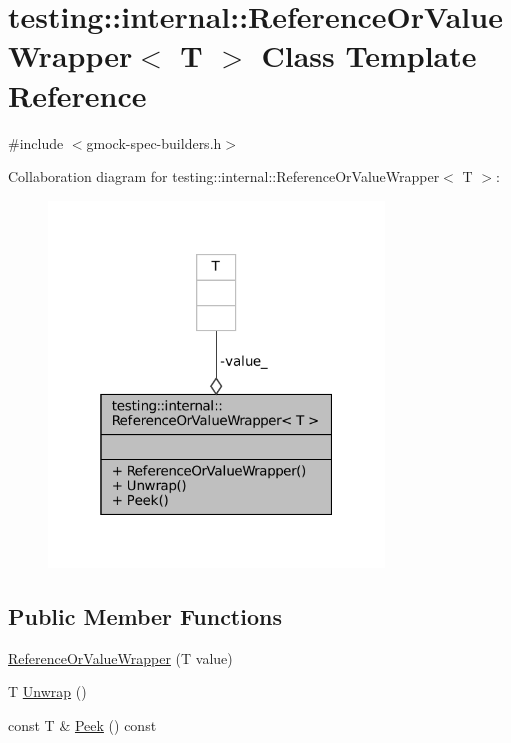 \hypertarget{classtesting_1_1internal_1_1ReferenceOrValueWrapper}{}\section{testing\+:\+:internal\+:\+:Reference\+Or\+Value\+Wrapper$<$ T $>$ Class Template Reference}
\label{classtesting_1_1internal_1_1ReferenceOrValueWrapper}


{\ttfamily \#include $<$gmock-\/spec-\/builders.\+h$>$}



Collaboration diagram for testing\+:\+:internal\+:\+:Reference\+Or\+Value\+Wrapper$<$ T $>$\+:
\nopagebreak
\begin{figure}[H]
\begin{center}
\leavevmode
\includegraphics[width=253pt]{classtesting_1_1internal_1_1ReferenceOrValueWrapper__coll__graph}
\end{center}
\end{figure}
\subsection*{Public Member Functions}
\begin{DoxyCompactItemize}
\item 
\hyperlink{classtesting_1_1internal_1_1ReferenceOrValueWrapper_ae5544acd43aa0feed92aa51b4186ede9}{Reference\+Or\+Value\+Wrapper} (T value)
\item 
T \hyperlink{classtesting_1_1internal_1_1ReferenceOrValueWrapper_a5a6505b809ba770725e7b8091927a5ba}{Unwrap} ()
\item 
const T \& \hyperlink{classtesting_1_1internal_1_1ReferenceOrValueWrapper_a235cdb913959a71ad2a98fdd0965fe59}{Peek} () const
\end{DoxyCompactItemize}
